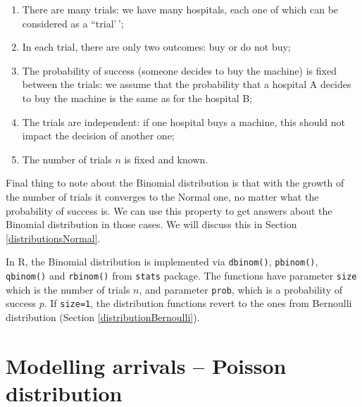 \documentclass[
]{book}
\providecommand{\tightlist}{%
  \setlength{\itemsep}{0pt}\setlength{\parskip}{0pt}}
\theoremstyle{definition}
\theoremstyle{definition}
\theoremstyle{definition}
\theoremstyle{definition}
\theoremstyle{remark}
\begin{document}
\begin{enumerate}
\def\labelenumi{\arabic{enumi}.}
\tightlist
\item
  There are many trials: we have many hospitals, each one of which can be considered as a ``trial'\,';
\item
  In each trial, there are only two outcomes: buy or do not buy;
\item
  The probability of success (someone decides to buy the machine) is fixed between the trials: we assume that the probability that a hospital A decides to buy the machine is the same as for the hospital B;
\item
  The trials are independent: if one hospital buys a machine, this should not impact the decision of another one;
\item
  The number of trials \(n\) is fixed and known.
\end{enumerate}

Final thing to note about the Binomial distribution is that with the growth of the number of trials it converges to the Normal one, no matter what the probability of success is. We can use this property to get answers about the Binomial distribution in those cases. We will discuss this in Section \ref{distributionsNormal}.

In R, the Binomial distribution is implemented via \texttt{dbinom()}, \texttt{pbinom()}, \texttt{qbinom()} and \texttt{rbinom()} from \texttt{stats} package. The functions have parameter \texttt{size} which is the number of trials \(n\), and parameter \texttt{prob}, which is a probability of success \(p\). If \texttt{size=1}, the distribution functions revert to the ones from Bernoulli distribution (Section \ref{distributionBernoulli}).

\hypertarget{distributionPoisson}{%
\section{Modelling arrivals -- Poisson distribution}\label{distributionPoisson}}
\end{document}
